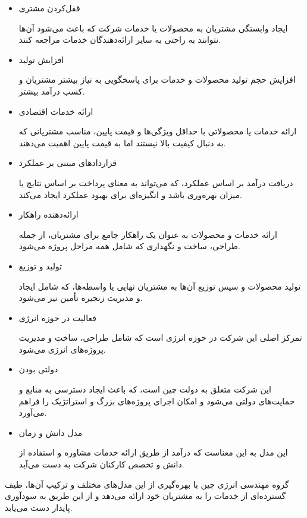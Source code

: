 \documentclass[dvipsnames, svgnames, x11names, 11pt, twocolumn]{article}
\begin{document}
\begin{itemize}
\item
قفل‌کردن مشتری

ایجاد وابستگی مشتریان به محصولات یا خدمات شرکت که باعث می‌شود آن‌ها نتوانند به راحتی به سایر ارائه‌دهندگان خدمات مراجعه کنند.
  
\item
افزایش تولید

افزایش حجم تولید محصولات و خدمات برای پاسخگویی به نیاز بیشتر مشتریان و کسب درآمد بیشتر.

\item
ارائه خدمات اقتصادی

ارائه خدمات یا محصولاتی با حداقل ویژگی‌ها و قیمت پایین، مناسب مشتریانی که به دنبال کیفیت بالا نیستند اما به قیمت پایین اهمیت می‌دهند.

\item
قراردادهای مبتنی بر عملکرد

دریافت درآمد بر اساس عملکرد، که می‌تواند به معنای پرداخت بر اساس نتایج یا میزان بهره‌وری باشد و انگیزه‌ای برای بهبود عملکرد ایجاد می‌کند.

\item
ارائه‌دهنده راهکار

ارائه خدمات و محصولات به عنوان یک راهکار جامع برای مشتریان، از جمله طراحی، ساخت و نگهداری که شامل همه مراحل پروژه می‌شود.

\item
تولید و توزیع

تولید محصولات و سپس توزیع آن‌ها به مشتریان نهایی یا واسطه‌ها، که شامل ایجاد و مدیریت زنجیره تأمین نیز می‌شود.

\item
فعالیت در حوزه انرژی

تمرکز اصلی این شرکت در حوزه انرژی است که شامل طراحی، ساخت و مدیریت پروژه‌های انرژی می‌شود.

\item
دولتی بودن

این شرکت متعلق به دولت چین است، که باعث ایجاد دسترسی به منابع و حمایت‌های دولتی می‌شود و امکان اجرای پروژه‌های بزرگ و استراتژیک را فراهم می‌آورد.

\item
مدل دانش و زمان

این مدل به این معناست که درآمد از طریق ارائه خدمات مشاوره و استفاده از دانش و تخصص کارکنان شرکت به دست می‌آید.
\end{itemize}

گروه مهندسی انرژی چین با بهره‌گیری از این مدل‌های مختلف و ترکیب آن‌ها، طیف گسترده‌ای از خدمات را به مشتریان خود ارائه می‌دهد و از این طریق به سودآوری پایدار دست می‌یابد.
\end{document}

